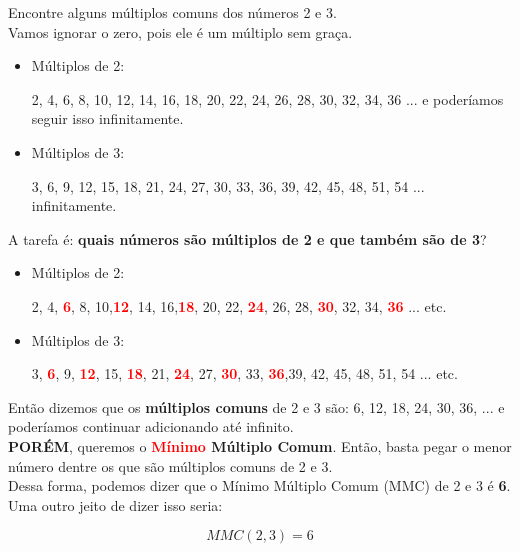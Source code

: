 \begin{exemplo}
    Encontre alguns múltiplos comuns dos números 2 e 3.\\

    Vamos ignorar o zero, pois ele é um múltiplo sem graça.
    
    \begin{itemize}
        \item Múltiplos de 2:

        2, 4, 6, 8, 10, 12, 14, 16, 18, 20, 22, 24, 26, 28, 30, 32, 34, 36 ... e poderíamos seguir isso infinitamente.

        \item Múltiplos de 3:

        3, 6, 9, 12, 15, 18, 21, 24, 27, 30, 33, 36, 39, 42, 45, 48, 51, 54 ... infinitamente.
    \end{itemize}

    A tarefa é: \textbf{quais números são múltiplos de 2 e que também são de 3}?
    \begin{itemize}
    
        \item Múltiplos de 2:

        2, 4, \textcolor{red}{\textbf{6}}, 8, 10,\textcolor{red}{\textbf{12}}, 14, 16,\textcolor{red}{\textbf{18}}, 20, 22, \textcolor{red}{\textbf{24}}, 26, 28, \textcolor{red}{\textbf{30}}, 32, 34, \textcolor{red}{\textbf{36}} ... etc.

        \item Múltiplos de 3:

        3, \textcolor{red}{\textbf{6}}, 9, \textcolor{red}{\textbf{12}}, 15, \textcolor{red}{\textbf{18}}, 21, \textcolor{red}{\textbf{24}}, 27, \textcolor{red}{\textbf{30}}, 33, \textcolor{red}{\textbf{36}},39, 42, 45, 48, 51, 54 ... etc.
    \end{itemize}

    Então dizemos que os \textbf{múltiplos comuns} de 2 e 3 são: 6, 12, 18, 24, 30, 36, ... e poderíamos continuar adicionando até infinito.\\

    \textbf{PORÉM}, queremos o \textbf{\textcolor{red}{Mínimo} Múltiplo Comum}. Então, basta pegar o menor número dentre os que são múltiplos comuns de 2 e 3.\\

    Dessa forma, podemos dizer que o Mínimo Múltiplo Comum (MMC) de 2 e 3 é \textbf{6}. Uma outro jeito de dizer isso seria:

    \begin{equation}
        MMC(2,3)=6
    \end{equation}
\end{exemplo}


